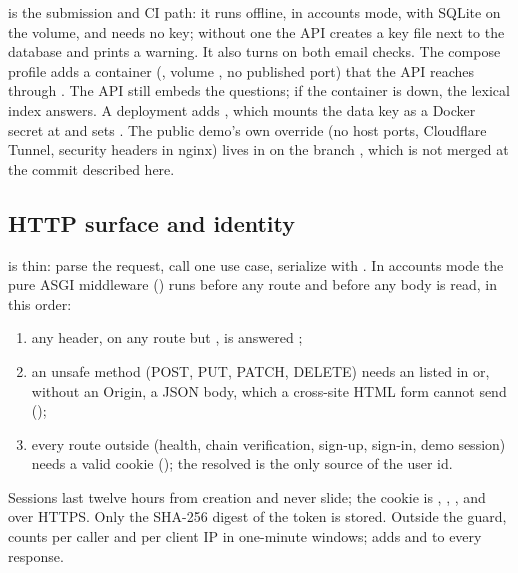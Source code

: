  is the submission and CI path: it runs offline, in accounts mode, with SQLite on the
 volume, and needs no key; without one the API creates a key file next to the database and prints a
warning. It also turns on both email checks. The compose profile  adds a  container
(, volume , no published port) that the API reaches through
. The API still embeds the questions; if the container is down, the lexical index answers. A deployment adds , which mounts the data key as a Docker secret at
 and sets . The public demo's own override (no host ports,
Cloudflare Tunnel, security headers in nginx) lives in  on the branch
, which is not merged at the commit described here.

\subsection{HTTP surface and identity}\label{sec:http}

 is thin: parse the request, call one use case, serialize with .
In accounts mode the pure ASGI middleware  () runs before any route and before any
body is read, in this order:
\begin{enumerate}
  \item any  header, on any route but , is answered ;
  \item an unsafe method (POST, PUT, PATCH, DELETE) needs an  listed in  or, without an
    Origin, a JSON body, which a cross-site HTML form cannot send ();
  \item every route outside  (health, chain verification, sign-up, sign-in, demo session) needs a
    valid  cookie (); the resolved  is the only source of the
    user id.
\end{enumerate}
Sessions last twelve hours from creation and never slide; the cookie is , ,
, and  over HTTPS. Only the SHA-256 digest of the token is stored. Outside the guard,
 counts per caller and per client IP in one-minute windows; 
adds  and  to every response.

